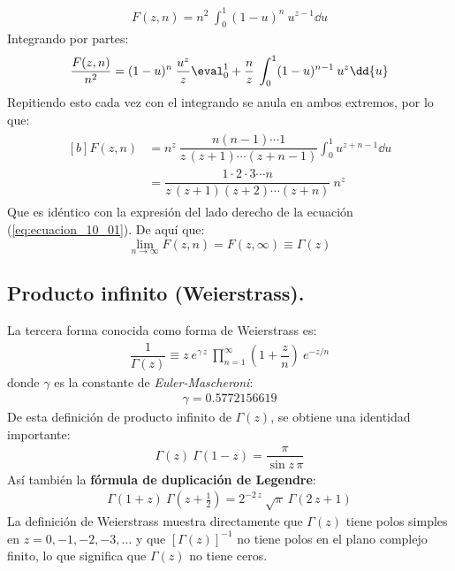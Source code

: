 \begin{align}
F(z,n) = n^{2} \: \int_{0}^{1} (1-u)^{n} \: u^{z-1} \dd{u}
\label{eq:ecuacion_10_12}
\end{align}
Integrando por partes:
\begin{align}
\dfrac{F(z, n)}{n^{2}} =  (1-u)^{n} \: \dfrac{u^{z}}{z} \eval_{0}^{1} + \dfrac{n}{z} \: \int_{0}^{1} (1-u)^{n-1} \: u^{z} \dd{u}
\label{eq:ecuacion_10_13}
\end{align}
Repitiendo esto cada vez con el integrando se anula en ambos extremos, por lo que:
\begin{align}
\begin{aligned}[b]
F(z,n) &= n^{z} \: \dfrac{n(n-1) \cdots 1}{z \, (z+1) \cdots (z+n-1)} \int_{0}^{1} u^{z+n-1} \dd{u} \\[0.5em]
&= \dfrac{1 \cdot 2 \cdot 3 \cdots n}{z \, (z+1)(z+2) \cdots (z+n)} \: n^{z}
\label{eq:ecuacion_10_14}
\end{aligned}
\end{align}
Que es idéntico con la expresión del lado derecho de la ecuación (\ref{eq:ecuacion_10_01}). De aquí que:
\begin{equation}
\lim_{n \to \infty} F(z, n) = F(z, \infty) \equiv \Gamma (z)
\label{eq:ecuacion_10_15}
\end{equation}

\subsection{Producto infinito (Weierstrass).}

La tercera forma conocida como forma de Weierstrass es:
\begin{align}
\dfrac{1}{\Gamma (z)} \equiv z \:  e^{\gamma \, z} \: \prod_{n=1}^{\infty} \left( 1 + \dfrac{z}{n} \right) \: e^{-z/n}
\label{eq:ecuacion_10_16}
\end{align}
donde $\gamma$ es la constante de \emph{Euler-Mascheroni}:
\begin{align}
\gamma = 0.5772156619
\label{eq:ecuacion_10_17}
\end{align}
De esta definición de producto infinito de $\Gamma (z)$, se obtiene una identidad importante:
\begin{align}
\Gamma (z) \: \Gamma (1 - z) = \dfrac{\pi}{\sin z \, \pi}
\label{eq:ecuacion_10_23}
\end{align}
Así también la \textbf{fórmula de duplicación de Legendre}:
\begin{align}
\Gamma (1 + z) \: \Gamma (z + \frac{1}{2}) = 2^{-2 \, z} \: \sqrt{\pi} \: \Gamma (2 \, z + 1)
\label{eq:ecuacion_10_24b}
\end{align}
La definición de Weierstrass muestra directamente que $\Gamma (z)$ tiene polos simples en $z = 0, -1, -2, -3, \ldots$ y que $[\Gamma (z)]^{-1}$ no tiene polos en el plano complejo finito, lo que significa que $\Gamma (z)$ no tiene ceros.

